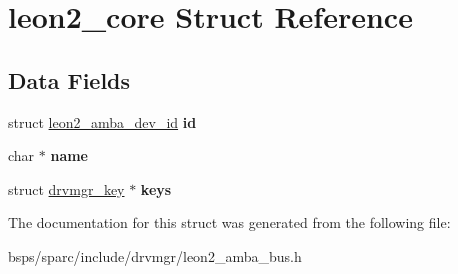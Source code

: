 \hypertarget{structleon2__core}{}\section{leon2\+\_\+core Struct Reference}
\label{structleon2__core}
\subsection*{Data Fields}
\begin{DoxyCompactItemize}
\item 
\mbox{\label{structleon2__core_a560f53b1b203cca58ecc1f1adab0b47f}} 
struct \mbox{\hyperlink{structleon2__amba__dev__id}{leon2\+\_\+amba\+\_\+dev\+\_\+id}} {\bfseries id}
\item 
\mbox{\label{structleon2__core_a48975e3bac6b6ba139bf13b8486fe90b}} 
char $\ast$ {\bfseries name}
\item 
\mbox{\label{structleon2__core_ad6562b8eaa231c44f636dbac93504af4}} 
struct \mbox{\hyperlink{structdrvmgr__key}{drvmgr\+\_\+key}} $\ast$ {\bfseries keys}
\end{DoxyCompactItemize}


The documentation for this struct was generated from the following file\+:\begin{DoxyCompactItemize}
\item 
bsps/sparc/include/drvmgr/leon2\+\_\+amba\+\_\+bus.\+h\end{DoxyCompactItemize}
